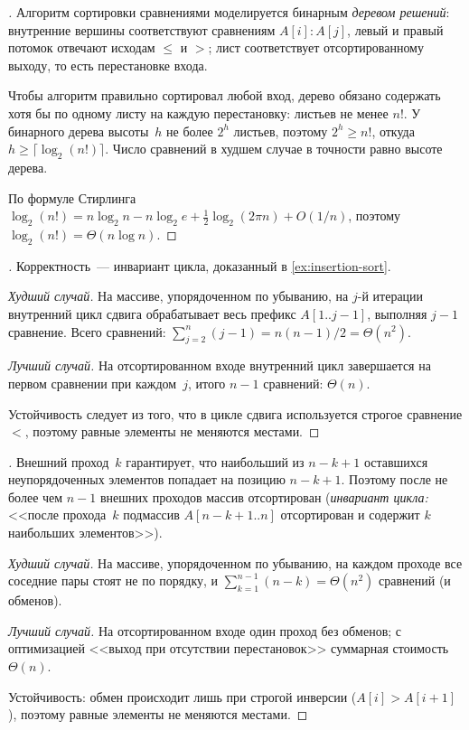 \begin{proof}[]
Алгоритм сортировки сравнениями моделируется бинарным
\emph{деревом решений}: внутренние вершины соответствуют сравнениям
$A[i] : A[j]$, левый и правый потомок отвечают исходам $\leq$ и $>$;
лист соответствует отсортированному выходу, то есть перестановке
входа.

Чтобы алгоритм правильно сортировал любой вход, дерево обязано
содержать хотя бы по одному листу на каждую перестановку: листьев не
менее $n!$. У бинарного дерева высоты~$h$ не более $2^h$ листьев,
поэтому $2^h \geq n!$, откуда $h \geq \lceil \log_2 (n!) \rceil$.
Число сравнений в худшем случае в точности равно высоте дерева.

По формуле Стирлинга
$\log_2(n!) = n \log_2 n - n \log_2 e + \tfrac{1}{2} \log_2(2\pi n) + O(1/n)$,
поэтому $\log_2(n!) = \Theta(n \log n)$.
\end{proof}

\begin{proof}[]
Корректность~--- инвариант цикла, доказанный в
\cref{ex:insertion-sort}.

\emph{Худший случай.} На массиве, упорядоченном по убыванию, на
$j$-й итерации внутренний цикл сдвига обрабатывает весь префикс
$A[1..j-1]$, выполняя $j - 1$ сравнение. Всего сравнений:
$\sum_{j=2}^{n} (j - 1) = n(n - 1)/2 = \Theta(n^2)$.

\emph{Лучший случай.} На отсортированном входе внутренний цикл
завершается на первом сравнении при каждом~$j$, итого $n - 1$
сравнений: $\Theta(n)$.

Устойчивость следует из того, что в цикле сдвига используется строгое
сравнение $<$, поэтому равные элементы не меняются местами.
\end{proof}

\begin{proof}[]
Внешний проход~$k$ гарантирует, что наибольший из $n - k + 1$
оставшихся неупорядоченных элементов попадает на позицию
$n - k + 1$. Поэтому после не более чем $n - 1$ внешних проходов
массив отсортирован (\emph{инвариант цикла:} <<после прохода~$k$
подмассив $A[n - k + 1 .. n]$ отсортирован и содержит $k$ наибольших
элементов>>).

\emph{Худший случай.} На массиве, упорядоченном по убыванию, на
каждом проходе все соседние пары стоят не по порядку, и
$\sum_{k=1}^{n-1} (n - k) = \Theta(n^2)$ сравнений (и обменов).

\emph{Лучший случай.} На отсортированном входе один проход без
обменов; с оптимизацией <<выход при отсутствии перестановок>>
суммарная стоимость $\Theta(n)$.

Устойчивость: обмен происходит лишь при строгой инверсии
($A[i] > A[i+1]$), поэтому равные элементы не меняются местами.
\end{proof}

